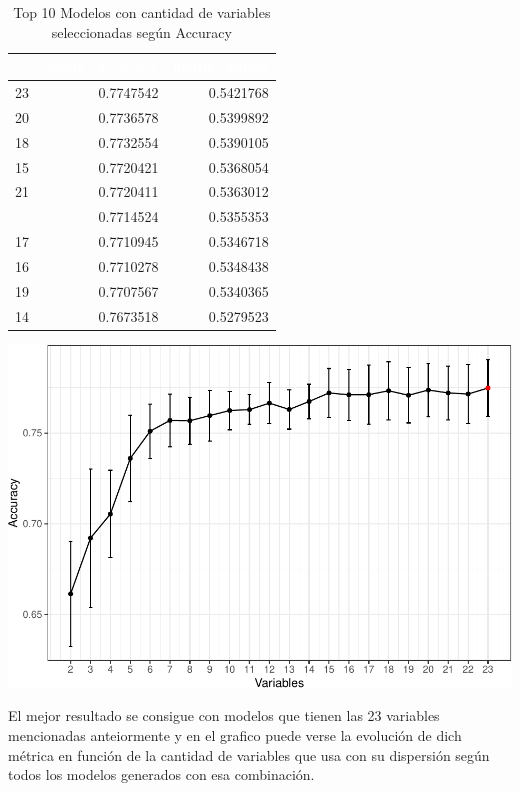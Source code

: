 \documentclass[]{article}
\begin{document}
\begin{table}[!h]

\caption{\label{tab:top_10_rfe_accuracy}Top 10 Modelos con cantidad de variables seleccionadas según Accuracy}
\centering
\begin{tabular}[t]{rrr}
\toprule
\rowcolor{black}  \multicolumn{1}{c}{\textcolor{white}{\textbf{Variables}}} & \multicolumn{1}{c}{\textcolor{white}{\textbf{media\_accuracy}}} & \multicolumn{1}{c}{\textcolor{white}{\textbf{media\_kappa}}}\\
\midrule
\rowcolor{gray!6}  23 & 0.7747542 & 0.5421768\\
20 & 0.7736578 & 0.5399892\\
\rowcolor{gray!6}  18 & 0.7732554 & 0.5390105\\
15 & 0.7720421 & 0.5368054\\
\rowcolor{gray!6}  21 & 0.7720411 & 0.5363012\\
\addlinespace
22 & 0.7714524 & 0.5355353\\
\rowcolor{gray!6}  17 & 0.7710945 & 0.5346718\\
16 & 0.7710278 & 0.5348438\\
\rowcolor{gray!6}  19 & 0.7707567 & 0.5340365\\
14 & 0.7673518 & 0.5279523\\
\bottomrule
\end{tabular}
\end{table}

\includegraphics{seleccion_variables_experimental_analisis_files/figure-latex/rfe_evolucion_accuracy-1.pdf}

El mejor resultado se consigue con modelos que tienen las 23 variables
mencionadas anteiormente y en el grafico puede verse la evolución de
dich métrica en función de la cantidad de variables que usa con su
dispersión según todos los modelos generados con esa combinación.
\end{document}
